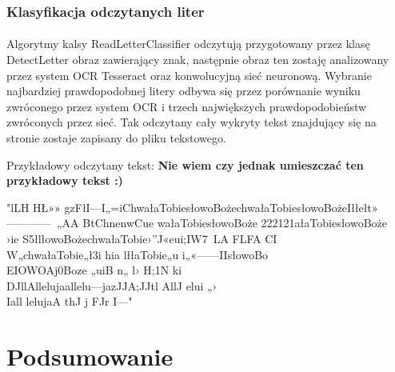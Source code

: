 \documentclass[a4paper,12pt]{article}
\begin{document}
        \subsubsection{Klasyfikacja odczytanych liter}
	        \paragraph{\indent} Algorytmy kalsy ReadLetterClassifier odczytują przygotowany     przez klasę DetectLetter obraz zawierający znak, następnie obraz ten        zostaję analizowany przez system OCR Tesseract oraz konwolucyjną sieć       neuronową. Wybranie najbardziej prawdopodobnej litery odbywa się przez      porównanie wyniku zwróconego przez system OCR i trzech największych         prawdopodobieństw zwróconych przez sieć. Tak odczytany cały wykryty         tekst znajdujący się na stronie zostaje zapisany do pliku tekstowego.
	        
	            Przykładowy odczytany tekst: \textbf{Nie wiem czy jednak umieszczać ten przykładowy tekst :)}
	        
	         "lLH HŁ»» gzFłI—I„=iChwałaTobiesłowoBożechwałaTobiesłowoBożeIłłełt»\\
	         ————~„AA    BtChnenwCue    wałaTobiesłowoBoże 222121ałaTobiesłowoBoże\\
	         ›ie   S5łlłowoBożechwałaTobie›”J«eui;IW7~LA   FLFA   CI\\   W„chwałaTobie„ł3i  hia      lłłaTobie„u    i„«——IIsłowoBo\\ EIOWOAj0Boze „uiB  n„   l›    H;1N ki\\ DJllAllelujaallelu—jazJJA;JJtl   AllJ      elui       „›\\ 
	         Iall lelujaA  thJ     j FJr      I—"  
	        
	        
	   \newpage  
	   \section{Podsumowanie}
\end{document}
